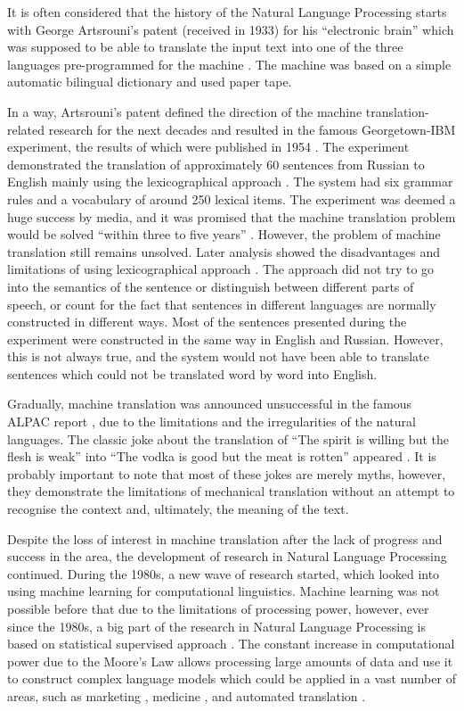 It is often considered that the history of the Natural Language Processing starts with George Artsrouni's patent (received in 1933) for his ``electronic brain'' which was supposed to be able to translate the input text into one of the three languages pre-programmed for the machine \cite{hutchins2004two}. The machine was based on a simple automatic bilingual dictionary and used paper tape. 

In a way, Artsrouni's patent defined the direction of the machine translation-related research for the next decades and resulted in the famous Georgetown-IBM experiment, the results of which were published in 1954 \cite{dostert1955georgetown}. The experiment demonstrated the translation of approximately 60 sentences from Russian to English mainly using the lexicographical approach \cite{hutchins2004georgetown}. The system had six grammar rules and a vocabulary of around 250 lexical items. The experiment was deemed a huge success by media, and it was promised that the machine translation problem would be solved ``within three to five years'' \cite{plumb1954russian}. However, the problem of machine translation still remains unsolved. Later analysis showed the disadvantages and limitations of using lexicographical approach \cite{garvin1968georgetown}. The approach did not try to go into the semantics of the sentence or distinguish between different parts of speech, or count for the fact that sentences in different languages are normally constructed in different ways. Most of the sentences presented during the experiment were constructed in the same way in English and Russian. However, this is not always true, and the system would not have been able to translate sentences which could not be translated word by word into English. 

Gradually, machine translation was announced unsuccessful in the famous ALPAC report \cite{national1966language}, due to the limitations and the irregularities of the natural languages. The classic joke about the translation of ``The spirit is willing but the flesh is weak'' into ``The vodka is good but the meat is rotten'' appeared \cite{hutchins1995whisky}. It is probably important to note that most of these jokes are merely myths, however, they demonstrate the limitations of mechanical translation without an attempt to recognise the context and, ultimately, the meaning of the text.

Despite the loss of interest in machine translation after the lack of progress and success in the area, the development of research in Natural Language Processing continued. During the 1980s, a new wave of research started, which looked into using machine learning for computational linguistics. Machine learning was not possible before that due to the limitations of processing power, however, ever since the 1980s, a big part of the research in Natural Language Processing is based on statistical supervised approach \cite{mcqueen1995applying, bergsma2010creating}. The constant increase in computational power due to the Moore's Law allows processing large amounts of data and use it to construct complex language models which could be applied in a vast number of areas, such as marketing \cite{goldberg1999automated}, medicine \cite{demner2009can}, and automated translation \cite{brants2007large}.

